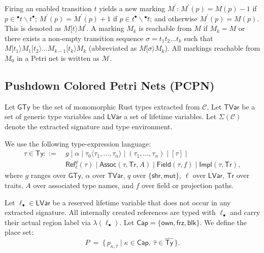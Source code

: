 \documentclass[runningheads]{llncs}
\begin{document}
Firing an enabled transition $t$ yields a new marking $M^{\prime}$:
$M^{\prime}(p)=M(p)-1$ if $p\in {}^{\bullet}t\backslash t^{\bullet}$;
$M^{\prime}(p)=M^{\prime}(p)+1$ if $p\in t^{\bullet}\backslash {}^{\bullet}t$;
and otherwise $M^{\prime}(p)=M(p)$. This is denoted as $M[t\rangle M^{\prime}$. A marking $M_{k}$ is reachable from $M$ if $M_{k}=M$ or there exists a non-empty transition sequence $\sigma=t_{1}t_{2}\dots t_{k}$ such that $M[t_{1}\rangle M_{1}[t_{2}\rangle \dots M_{k-1}[t_{k}\rangle M_{k}$ (abbreviated as $M[\sigma \rangle M_{k}$). All markings reachable from $M_{0}$ in a Petri net is written as $\mathcal{M}$.


\subsection{Pushdown Colored Petri Nets (PCPN)}
\label{sec:method:pcpn}
Let $\mathsf{GTy}$ be the set of monomorphic Rust types extracted from $\mathcal{C}$. Let $\mathsf{TVar}$ be a set of generic type variables and $\mathsf{LVar}$ a set of lifetime variables. Let $\Sigma(\mathcal{C})$ denote the extracted signature and type environment.

We use the following type-expression language:
\begin{align*}
\tau \in \mathsf{Ty} ::=~&
g \mid \alpha \mid \tau_0\langle \tau_1,\dots,\tau_n\rangle \mid (\tau_1,\dots,\tau_n) \mid [\tau] \mid \\
& \mathsf{Ref}^q_{\ell}(\tau) \mid \mathsf{Assoc}(\tau,\mathsf{Tr},A) \mid \mathsf{Field}(\tau,f) \mid \mathsf{Impl}(\tau,\mathsf{Tr}),
\end{align*}
where $g$ ranges over $\mathsf{GTy}$, $\alpha$ over $\mathsf{TVar}$, $q$ over $\{\mathsf{shr},\mathsf{mut}\}$,  
$\ell$ over $\mathsf{LVar}$, $\mathsf{Tr}$ over traits, $A$ over associated type names, and $f$ over field or projection paths.

Let $\ell_{\bullet}\in \mathsf{LVar}$ be a reserved lifetime variable that does not occur in any extracted signature. All internally created references are typed with $\ell_{\bullet}$ and carry their actual region label via $\lambda(\ell_{\bullet})$. Let $\mathsf{Cap}=\{\mathsf{own},\mathsf{frz},\mathsf{blk}\}$.
We define the place set:
\begin{equation*}
   P ~=~ \{\, p_{\kappa,\hat\tau} \mid \kappa\in\mathsf{Cap},~ \hat\tau\in\widehat{\mathsf{Ty}} \,\}.
\end{equation*}
\end{document}
